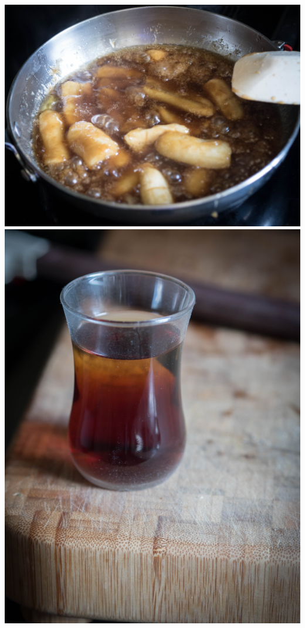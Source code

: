 \newpage
\includegraphics[width=\textwidth]{food/bananas-foster/images/hi-res/06.jpg}
\newpage
\includegraphics[height=\textheight]{food/bananas-foster/images/hi-res/07.jpg}
